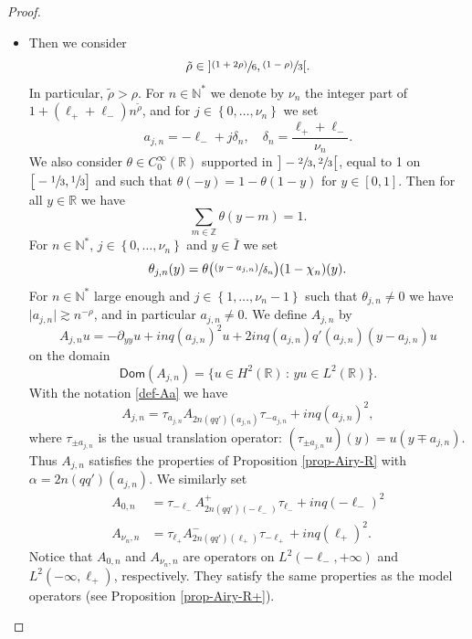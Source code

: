 \documentclass[JEP,XML,SOM,Unicode]{cedram}
\newcommand{\psfrac}[2]{\sfrac{(#1)}{#2}}
\theoremstyle{plain}
\theoremstyle{definition}
\newcommand{\abs}[1]{\vert #1\vert}
\newcommand{\set}[1]{\{ #1\}}
\newcommand{\Ii}[2] {\left\{ #1,\dots,#2 \right\}}
\newcommand{\1}{\mathds 1}
\newcommand{\st}{\,:\,}
\newcommand{\Dom}{\mathsf{Dom}}
\newcommand{\R}{\mathbb{R}}
\newcommand{\N}{\mathbb{N}}
\newcommand{\Z}{\mathbb{Z}}
\let\a\alpha
\let\d\delta
\let\th\theta
\begin{document}
\begin{proof}
\begin{itemize}
\item
Then we consider
\[
\tilde \rho \in {}] \psfrac {1+2\rho} 6, \psfrac {1-\rho} 3[.
\]
In particular, $\tilde \rho > \rho$. For $n \in \N^*$ we denote by $\nu_n$ the integer part of $1+ (\ell_+ + \ell_-) n^{\tilde \rho}$, and for $j \in \Ii 0 {\nu_n}$ we set
\[
a_{j,n} = -\ell_- + j \d_n, \quad \d_n = \frac {\ell_+ + \ell_-}{\nu_n}.
\]
We also consider $\theta \in C_0^\infty(\R)$ supported in $\big]-\sfrac 23,\sfrac 23\big[$, equal to 1 on $\big[-\sfrac 13,\sfrac 13\big]$ and such that $\th(-y) = 1-\th(1-y)$ for $y \in [0,1]$. Then for all $y \in \R$ we have
\[
\sum_{m \in \Z} \theta(y-m) = 1.
\]
For $n \in \N^*$, $j \in \Ii 0 {\nu_n}$ and $y \in \bar I$ we set
\[
\theta_{j,n}(y) = \theta \bigl(\psfrac {y-a_{j,n}}{\d_n} \bigr) (1-\chi_n)(y).
\]
For $n \in \N^*$ large enough and $j \in \Ii 1 {\nu_n-1}$ such that $\th_{j,n} \neq 0$ we have \hbox{$\abs{a_{j,n}} \gtrsim n^{-\rho}$}, and in particular $a_{j,n}\neq 0$. We define $A_{j,n}$ by
\[
A_{j,n} u = -\partial_{yy} u + in q(a_{j,n})^2 u + 2 i n q(a_{j,n}) q'(a_{j,n}) (y-a_{j,n}) u
\]
on the domain
\[
\Dom(A_{j,n}) = \set{u \in H^2(\R) \st y u \in L^2(\R)}.
\]
With the notation \eqref{def-Aa} we have
\[
A_{j,n} = \tau_{a_{j,n}} A_{2n(qq')(a_{j,n})} \tau_{-a_{j,n}} + i n q(a_{j,n})^2,
\]
where $\tau_{\pm a_{j,n}}$ is the usual translation operator: $(\tau_{\pm a_{j,n}} u)(y) = u(y \mp a_{j,n})$. Thus $A_{j,n}$ satisfies the properties of Proposition \ref{prop-Airy-R} with $\a = 2n (qq')(a_{j,n})$. We similarly set
\begin{align*}
A_{0,n} &= \tau_{-\ell_-} A_{2n(qq')(-\ell_-)}^+ \tau_{\ell_-} + i n q(-\ell_-)^2
\\
\tag*{and}
A_{\nu_n,n} &= \tau_{\ell_+} A_{2n(qq')(\ell_+)}^- \tau_{-\ell_+} + i n q(\ell_+)^2.
\end{align*}
Notice that $A_{0,n}$ and $A_{\nu_n,n}$ are operators on $L^2(-\ell_-,+\infty)$ and $L^2(-\infty,\ell_+)$, respectively. They satisfy the same properties as the model operators (see Proposition \ref{prop-Airy-R+}).


\end{itemize}
\end{proof}
\end{document}
